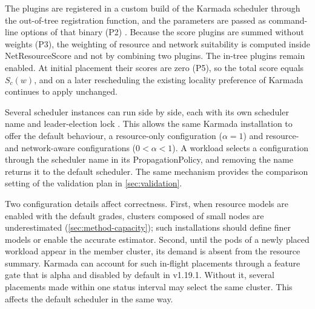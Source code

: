 The plugins are registered in a custom build of the Karmada scheduler through the out-of-tree registration function, and the parameters are passed as command-line options of that binary (P2) \cite{karmada_docs_custom_scheduler}. Because the score plugins are summed without weights (P3), the weighting of resource and network suitability is computed inside NetResourceScore and not by combining two plugins. The in-tree plugins remain enabled. At initial placement their scores are zero (P5), so the total score equals $S_c(w)$, and on a later rescheduling the existing locality preference of Karmada continues to apply unchanged.

Several scheduler instances can run side by side, each with its own scheduler name and leader-election lock \cite{karmada_docs_custom_scheduler}. This allows the same Karmada installation to offer the default behaviour, a resource-only configuration ($\alpha = 1$) and resource- and network-aware configurations ($0 < \alpha < 1$). A workload selects a configuration through the scheduler name in its PropagationPolicy, and removing the name returns it to the default scheduler. The same mechanism provides the comparison setting of the validation plan in \cref{sec:validation}.

Two configuration details affect correctness. First, when resource models are enabled with the default grades, clusters composed of small nodes are underestimated (\cref{sec:method-capacity}); such installations should define finer models or enable the accurate estimator. Second, until the pods of a newly placed workload appear in the member cluster, its demand is absent from the resource summary. Karmada can account for such in-flight placements through a feature gate that is alpha and disabled by default in v1.19.1. Without it, several placements made within one status interval may select the same cluster. This affects the default scheduler in the same way.
